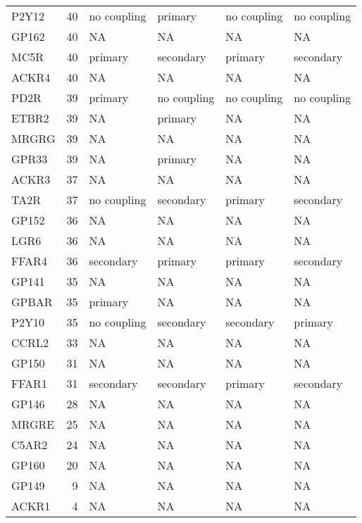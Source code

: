 \begin{longtable}{lrllll}
P2Y12 & 40 & no coupling & primary & no coupling & no coupling\\
GP162 & 40 & NA & NA & NA & NA\\
MC5R & 40 & primary & secondary & primary & secondary\\
\addlinespace
ACKR4 & 40 & NA & NA & NA & NA\\
PD2R & 39 & primary & no coupling & no coupling & no coupling\\
ETBR2 & 39 & NA & primary & NA & NA\\
MRGRG & 39 & NA & NA & NA & NA\\
GPR33 & 39 & NA & primary & NA & NA\\
\addlinespace
ACKR3 & 37 & NA & NA & NA & NA\\
TA2R & 37 & no coupling & secondary & primary & secondary\\
GP152 & 36 & NA & NA & NA & NA\\
LGR6 & 36 & NA & NA & NA & NA\\
FFAR4 & 36 & secondary & primary & primary & secondary\\
\addlinespace
GP141 & 35 & NA & NA & NA & NA\\
GPBAR & 35 & primary & NA & NA & NA\\
P2Y10 & 35 & no coupling & secondary & secondary & primary\\
CCRL2 & 33 & NA & NA & NA & NA\\
GP150 & 31 & NA & NA & NA & NA\\
\addlinespace
FFAR1 & 31 & secondary & secondary & primary & secondary\\
GP146 & 28 & NA & NA & NA & NA\\
MRGRE & 25 & NA & NA & NA & NA\\
C5AR2 & 24 & NA & NA & NA & NA\\
GP160 & 20 & NA & NA & NA & NA\\
\addlinespace
GP149 & 9 & NA & NA & NA & NA\\
ACKR1 & 4 & NA & NA & NA & NA\\*
\end{longtable}
